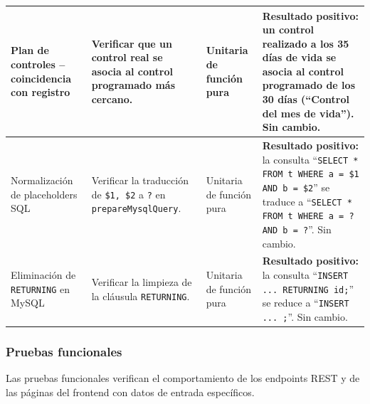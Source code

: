 \documentclass[12pt,letterpaper]{article}
\begin{document}
\begin{longtable}{p{}p{}p{}p{}}
Plan de controles -- coincidencia con registro & Verificar que un control real se asocia al control programado más cercano. & Unitaria de función pura & \textbf{Resultado positivo:} un control realizado a los 35 días de vida se asocia al control programado de los 30 días (``Control del mes de vida''). Sin cambio.\\\hline
Normalización de placeholders SQL & Verificar la traducción de \texttt{\$1, \$2} a \texttt{?} en \texttt{prepareMysqlQuery}. & Unitaria de función pura & \textbf{Resultado positivo:} la consulta ``\texttt{SELECT * FROM t WHERE a = \$1 AND b = \$2}'' se traduce a ``\texttt{SELECT * FROM t WHERE a = ? AND b = ?}''. Sin cambio.\\\hline
Eliminación de \texttt{RETURNING} en MySQL & Verificar la limpieza de la cláusula \texttt{RETURNING}. & Unitaria de función pura & \textbf{Resultado positivo:} la consulta ``\texttt{INSERT ... RETURNING id;}'' se reduce a ``\texttt{INSERT ... ;}''. Sin cambio.\\\bottomrule
\end{longtable}

\subsubsection{Pruebas funcionales}

Las pruebas funcionales verifican el comportamiento de los endpoints REST y de las páginas del frontend con datos de entrada específicos.
\end{document}
